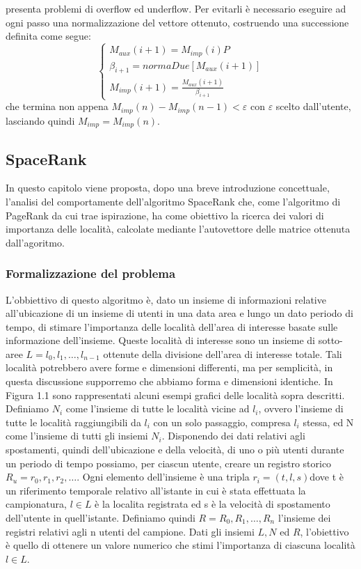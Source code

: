 presenta problemi di overflow ed underflow. Per evitarli \`e necessario
eseguire ad ogni passo una normalizzazione del vettore ottenuto, costruendo
una successione definita come segue:
\begin{equation}
\left\{\begin{matrix}
M_{aux}(i+1) = M_{imp}(i)P
\\ \beta_{i+1} = normaDue[M_{aux}(i+1)]
\\ M_{imp}(i+1) = \frac{M_{aux}(i+1)}{\beta_{i+1}}
\end{matrix}\right.
\end{equation}
che termina non appena $ M_{imp}(n) - M_{imp}(n- 1) < \varepsilon $ con $ \varepsilon $ scelto dall'utente,
lasciando quindi $ M_{imp} = M_{imp}(n) $.

\subsection{SpaceRank}
In questo capitolo viene proposta, dopo una breve introduzione concettuale, l'analisi
del comportamente dell'algoritmo SpaceRank \cite{cit_49} che, come l'algoritmo di
PageRank da cui trae ispirazione, ha come obiettivo la ricerca dei valori di importanza
delle localit\`a, calcolate mediante l'autovettore delle matrice ottenuta dall'agoritmo.

\subsubsection{Formalizzazione del problema}
L'obbiettivo di questo algoritmo \`e, dato un insieme di informazioni relative all'ubicazione
di un insieme di utenti in una data area e lungo un dato periodo di tempo, di stimare
l'importanza delle localit\`a dell'area di interesse basate sulle informazione dell'insieme.
Queste localit\`a di interesse sono un insieme di sotto-aree $L = l_{0},l_{1},\dots,l_{n-1}$
ottenute della divisione dell'area di interesse totale. Tali localit\`a potrebbero
avere forme e dimensioni differenti, ma per semplicit\`a, in questa discussione
supporremo che abbiamo forma e dimensioni identiche. In Figura 1.1 sono rappresentati
alcuni esempi grafici delle localit\`a sopra descritti.\\
Definiamo $N_{i}$ come l'insieme di tutte le localit\`a vicine ad $l_{i}$, ovvero l'insieme
di tutte le localit\`a raggiungibili da $l_{i}$ con un solo passaggio, compresa $l_{i}$ stessa,
ed N come l'insieme di tutti gli insiemi $N_{i}$. Disponendo dei dati relativi
agli spostamenti, quindi dell'ubicazione e della velocit\`a, di uno o pi\`u utenti
durante un periodo di tempo possiamo, per ciascun utente, creare un registro
storico $R_{u} = r_{0},r_{1},r_{2},\dots$. Ogni elemento dell'insieme \`e una tripla
$r_{i} = (t,l,s)$dove t \`e un riferimento temporale relativo all'istante in cui \`e
stata effettuata la campionatura, $l \in L$ \`e la localita registrata ed s \`e
la velocit\`a di spostamento dell'utente in quell'istante. Definiamo quindi $R = R_{0},R_{1},\dots,R_{n}$
l'insieme dei registri relativi agli n utenti del campione. Dati gli insiemi $L, N$ ed $R$, l'obiettivo \`e quello di ottenere
un valore numerico che stimi l'importanza di ciascuna localit\`a $l \in L$.

